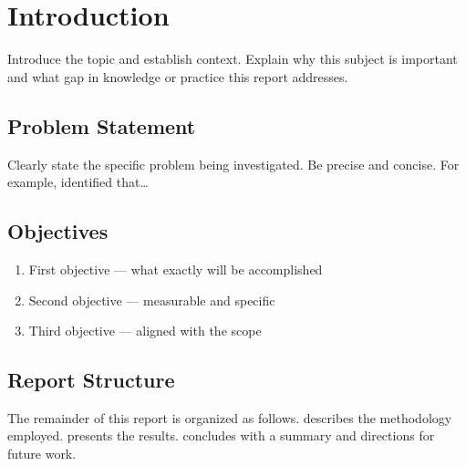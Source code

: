 \section{Introduction}
\label{sec:introduction}

Introduce the topic and establish context. Explain why this subject is important
and what gap in knowledge or practice this report addresses.

\subsection{Problem Statement}
\label{sec:problem}

Clearly state the specific problem being investigated. Be precise and concise.
For example, \textcite{example2024} identified that\ldots

\subsection{Objectives}
\label{sec:objectives}

\begin{enumerate}[label=\textbf{O\arabic*.}]
  \item First objective — what exactly will be accomplished
  \item Second objective — measurable and specific
  \item Third objective — aligned with the scope
\end{enumerate}

\subsection{Report Structure}

The remainder of this report is organized as follows.
 describes the methodology employed.
 presents the results.
 concludes with a summary and directions for future work.

